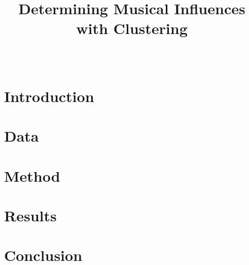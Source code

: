 \documentclass[12pt]{article}
\title{Determining Musical Influences with Clustering}
\author{\names \\
        \class }
\begin{document}
    \begingroup
        \let\newpage\relax%
        \maketitle
    \endgroup

    \section{Introduction}
        
    \section{Data}
        
    \section{Method}
        
    \section{Results}
        
    \section{Conclusion}
        
   
\end{document}
